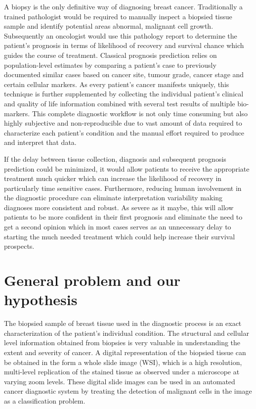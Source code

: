 \documentclass{l4proj}
\begin{document}
A biopsy is the only definitive way of diagnosing breast cancer. Traditionally a trained pathologist would be required to manually inspect a biopsied tissue sample and identify potential areas  abnormal, malignant cell growth. Subsequently an oncologist would use this pathology report to determine the patient's prognosis in terms of likelihood of recovery and survival chance which guides the course of treatment. Classical prognosis prediction  relies on population-level estimates by comparing a patient's case to previously documented similar cases based on cancer site, tumour grade, cancer stage and certain cellular markers. As every patient's cancer manifests uniquely, this technique is further supplemented by collecting the individual patient's clinical and quality of life information combined with several test results of multiple bio-markers. This complete diagnostic workflow is not only time consuming but also highly subjective and non-reproducible due to vast amount of data required to characterize each patient's condition and the manual effort required to produce and interpret that data.

If the delay between tissue collection, diagnosis and subsequent prognosis prediction could be minimized, it would allow patients to receive the appropriate treatment much quicker which can increase the likelihood of recovery in particularly time sensitive cases. Furthermore, reducing human involvement in the diagnostic procedure can eliminate interpretation variability making diagnoses more consistent and robust. As severe as it maybe, this will allow patients to be more confident in their first prognosis and eliminate the need to get a second opinion which in most cases serves as an unnecessary delay to starting the much needed treatment which could help increase their survival prospects. 


\section{General problem and our hypothesis}
The biopsied sample of breast tissue used in the diagnostic process is an exact characterization of the patient's individual condition. The structural and cellular level information obtained from biopsies is very valuable in understanding the extent and severity of cancer. A digital representation of the biopsied tissue can be obtained in the form a whole slide image (WSI), which is a high resolution, multi-level replication of the stained tissue as observed under a microscope at varying zoom levels. These digital slide images can be used in an automated cancer diagnostic system by treating the detection of malignant cells in the image as a classification problem. 
\end{document}
